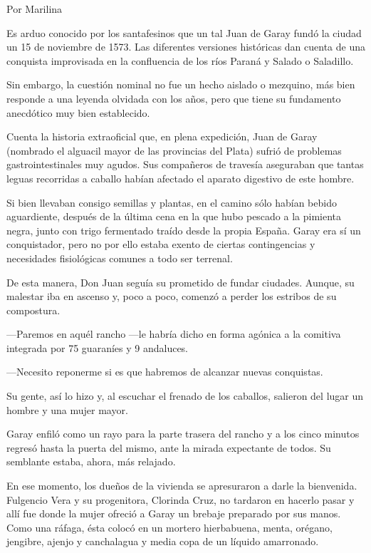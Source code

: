 \documentclass[11pt,twoside,openright,a5paper]{book}
\begin{document}
                                          \begin{flushright}Por Marilina\end{flushright}

Es arduo conocido por los santafesinos que un tal Juan de Garay fundó la ciudad un 15 de noviembre de 1573. Las diferentes versiones históricas dan cuenta de una conquista improvisada en la confluencia de los ríos Paraná y Salado o Saladillo.

Sin embargo, la cuestión nominal no fue un hecho aislado o mezquino, más bien responde a una leyenda olvidada con los años, pero que tiene su fundamento anecdótico muy bien establecido.

Cuenta la historia extraoficial que, en plena expedición, Juan de Garay (nombrado el alguacil mayor de las provincias del Plata) sufrió de problemas gastrointestinales muy agudos. Sus compañeros de travesía aseguraban que tantas leguas recorridas a caballo habían afectado el aparato digestivo de este hombre.

Si bien llevaban consigo semillas y plantas, en el camino sólo habían bebido aguardiente, después de la última cena en la que hubo pescado a la pimienta negra, junto con trigo fermentado traído desde la propia España. Garay era sí un conquistador, pero no por ello estaba exento de ciertas contingencias y necesidades fisiológicas comunes a todo ser terrenal.

De esta manera, Don Juan seguía su prometido de fundar ciudades. Aunque, su malestar iba en ascenso y, poco a poco, comenzó a perder los estribos de su compostura. 

---Paremos en aquél rancho ---le habría dicho en forma agónica a la comitiva integrada por 75 guaraníes y 9 andaluces.

---Necesito reponerme si es que habremos de alcanzar nuevas conquistas.

Su gente, así lo hizo y, al escuchar el frenado de los caballos, salieron del lugar un hombre y una mujer mayor.

Garay enfiló como un rayo para la parte trasera del rancho y a los cinco minutos regresó hasta la puerta del mismo, ante la mirada expectante de todos. Su semblante estaba, ahora, más relajado.

En ese momento, los dueños de la vivienda se apresuraron a darle la bienvenida. Fulgencio Vera y su progenitora, Clorinda Cruz, no tardaron en hacerlo pasar y allí fue donde la mujer ofreció a Garay un brebaje preparado por sus manos. Como una ráfaga, ésta colocó en un mortero hierbabuena, menta, orégano, jengibre, ajenjo y canchalagua y media copa de un líquido amarronado. 
\end{document}
